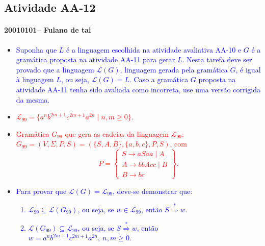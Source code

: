 \documentclass[12pt]{article}
\def\discente{Fulano de tal}
\def\matricula{20010101}
\def\aa{12}
\def\myling{{99}} %
\newcommand{\deriv}[1]{\stackrel{\scriptscriptstyle #1}{\Longrightarrow}}
\begin{document}
\subsection*{Atividade AA-\aa}
 \paragraph{\matricula -- \discente}
%
 \begin{itemize}
 \item \textcolor{blue}{Suponha que $L$ é a linguagem escolhida na atividade avaliativa AA-10 e $G$ é a gramática proposta na atividade AA-11 para gerar $L$.  Nesta tarefa deve ser provado que a linguagem $\mathcal{L}(G)$, linguagem gerada pela gramática $G$, é igual à linguagem $L$, ou seja, $\mathcal{L}(G)=L$. Caso a gramática $G$ proposta na atividade AA-11 tenha sido avaliada como incorreta, use uma versão corrigida da mesma.}
  \item \textcolor{red}{$\mathcal{L}_{\myling} = \{a^nb^{2m+1}c^{2m+1}a^{2n} \mid n,m \geqslant 0\}$.}
  \item  \textcolor{red}{Gramática $G_{\myling}$ que gera as cadeias da linguagem $\mathcal{L}_{\myling}$:\\ $G_{\myling}=(V,\Sigma,P,S)=(\{S,A,B\},\{a,b,c\},P,S)$, com
  $$
   P =
   \left\{\begin{array}{l}
    S\to aSaa\mid A\\
    A\to bbAcc\mid B\\
    B\to bc
   \end{array}\right\}.
  $$
  }
 \item \textcolor{blue}{
 Para provar que $\mathcal{L}(G)=\mathcal{L}_{\myling}$, deve-se demonstrar que:
    \begin{enumerate}[label=\alph*)]
     \item $\mathcal{L}_{\myling} \subseteq\mathcal{L}(G_{99})$, ou seja, se $w\in \mathcal{L}_{\myling}$, então $S \deriv{*} w$. 
     \item $\mathcal{L}(G_{99})\subseteq \mathcal{L}_{\myling}$, ou seja, se $S \deriv{*} w$, então $w = a^nb^{2m+1}c^{2m+1}a^{2n},\> n,m \geqslant 0$.
    \end{enumerate}
 }
\end{itemize}
\end{document}
